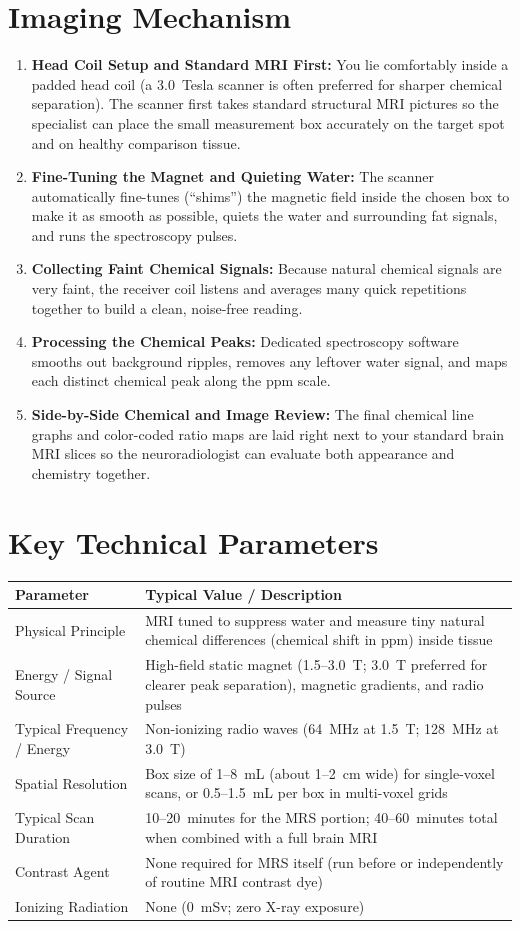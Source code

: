 \section{Imaging Mechanism}
\begin{enumerate}
\item \textbf{Head Coil Setup and Standard MRI First:} You lie comfortably inside a padded head coil (a 3.0~Tesla scanner is often preferred for sharper chemical separation). The scanner first takes standard structural MRI pictures so the specialist can place the small measurement box accurately on the target spot and on healthy comparison tissue.
\item \textbf{Fine-Tuning the Magnet and Quieting Water:} The scanner automatically fine-tunes (``shims'') the magnetic field inside the chosen box to make it as smooth as possible, quiets the water and surrounding fat signals, and runs the spectroscopy pulses.
\item \textbf{Collecting Faint Chemical Signals:} Because natural chemical signals are very faint, the receiver coil listens and averages many quick repetitions together to build a clean, noise-free reading.
\item \textbf{Processing the Chemical Peaks:} Dedicated spectroscopy software smooths out background ripples, removes any leftover water signal, and maps each distinct chemical peak along the ppm scale.
\item \textbf{Side-by-Side Chemical and Image Review:} The final chemical line graphs and color-coded ratio maps are laid right next to your standard brain MRI slices so the neuroradiologist can evaluate both appearance and chemistry together.
\end{enumerate}

\section{Key Technical Parameters}
\noindent
\begin{tabularx}{\textwidth}{@{}l X@{}}
\toprule
\textbf{Parameter} & \textbf{Typical Value / Description} \\
\midrule
Physical Principle & MRI tuned to suppress water and measure tiny natural chemical differences (chemical shift in ppm) inside tissue \\
Energy / Signal Source & High-field static magnet (1.5--3.0~T; 3.0~T preferred for clearer peak separation), magnetic gradients, and radio pulses \\
Typical Frequency / Energy & Non-ionizing radio waves (64~MHz at 1.5~T; 128~MHz at 3.0~T) \\
Spatial Resolution & Box size of 1--8~mL (about 1--2~cm wide) for single-voxel scans, or 0.5--1.5~mL per box in multi-voxel grids \\
Typical Scan Duration & 10--20~minutes for the MRS portion; 40--60~minutes total when combined with a full brain MRI \\
Contrast Agent & None required for MRS itself (run before or independently of routine MRI contrast dye) \\
Ionizing Radiation & None (0~mSv; zero X-ray exposure) \\
\bottomrule
\end{tabularx}

